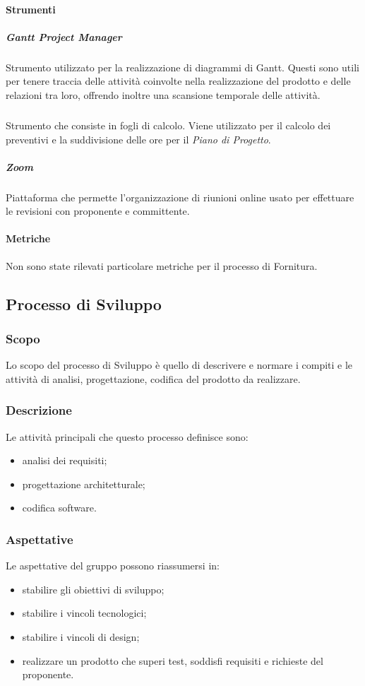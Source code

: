   \paragraph{Strumenti}
    \subparagraph*{Gantt Project Manager} \hfill \break
    Strumento utilizzato per la realizzazione di diagrammi di Gantt. Questi sono utili per tenere traccia 
delle attività coinvolte nella realizzazione del prodotto e delle relazioni
    tra loro, offrendo inoltre una scansione temporale delle attività.
    \subparagraph*{  } \hfill \break
Strumento che consiste in fogli di calcolo. Viene utilizzato per il calcolo dei preventivi e la suddivisione delle ore per il \textit{Piano di Progetto}.
    \subparagraph*{Zoom} \hfill \break
Piattaforma che permette l'organizzazione di riunioni online usato per effettuare le revisioni con proponente e committente.
  \paragraph{Metriche}  \hfill \break
  Non sono state rilevati particolare metriche per il processo di Fornitura.

\subsection{Processo di Sviluppo}
\subsubsection{Scopo}
Lo scopo del processo di Sviluppo è quello di descrivere e normare i compiti e le attività di analisi, progettazione, codifica del prodotto da realizzare.

\subsubsection{Descrizione}
Le attività principali che questo processo definisce sono:
\begin{itemize}
\item analisi dei requisiti;
\item progettazione architetturale;
\item codifica software.
\end{itemize}
    
\subsubsection{Aspettative}
Le aspettative del gruppo possono riassumersi in:
\begin{itemize}
    \item stabilire gli obiettivi di sviluppo;
    \item stabilire i vincoli tecnologici;
    \item stabilire i vincoli di design;
    \item realizzare un prodotto che superi test, soddisfi requisiti e richieste del proponente.
\end{itemize}

